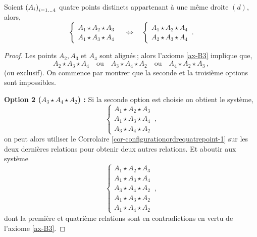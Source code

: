 \begin{cor}\label{cor-configurationordrequatrepoint-3}
    Soient $\left(A_{i}\right)_{i = 1\ldots 4}$ quatre points distincts appartenant à une même droite $(d)$, alors,
    \begin{equation*}
        \left\{
            \begin{array}{c}
                 A_1 \star A_2 \star A_3 \\
                 A_1 \star A_3 \star A_4
            \end{array}
            \right. \quad \Longleftrightarrow \quad \left\{
            \begin{array}{c}
                A_1 \star A_2 \star A_4\\
                A_2 \star A_3 \star A_4
            \end{array}
            \right.
            \,.
    \end{equation*}
    \begin{proof}
        Les points $A_2,A_3$ et $A_4$ sont alignés\,; alors l'axiome \ref{ax-B3} implique que,
        \begin{equation*}
            A_2 \star A_3 \star A_4 \quad\text{ou}\quad A_3 \star A_4 \star A_2 \quad\text{ou}\quad A_4 \star A_2 \star A_3 \,,
        \end{equation*}
        (ou exclusif). On commence par montrer que la seconde et la troisième options sont impossibles. 
        
        \textbf{Option 2 ($A_3 \star A_4 \star A_2$) :}  Si la seconde option est choisie on obtient le système,
        \begin{equation*}
        \left\{
            \begin{array}{c}
                 A_1 \star A_2 \star A_3 \\
                 A_1 \star A_3 \star A_4 \\
                 A_3 \star A_4 \star A_2 
            \end{array}
            \right. \,,
        \end{equation*}
        on peut alors utiliser le Corrolaire \ref{cor-configurationordrequatrepoint-1} sur les deux dernières relations pour obtenir deux autres relations. Et aboutir aux système
        \begin{equation*}
        \left\{
            \begin{array}{c}
                 A_1 \star A_2 \star A_3 \\
                 A_1 \star A_3 \star A_4 \\
                 A_3 \star A_4 \star A_2 \\
                 A_1 \star A_3 \star A_2 \\
                 A_1 \star A_4 \star A_2 
            \end{array}
            \right. \,,
        \end{equation*}
        dont la première et quatrième relations sont en contradictions en vertu de l'axiome \ref{ax-B3}.


\end{proof}
\end{cor}
